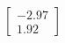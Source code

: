 \documentclass[preview]{standalone}
\begin{document}
\begin{align*}
\begin{bmatrix} -2.97 \\ 1.92 \end{bmatrix}
\end{align*}
\end{document}
